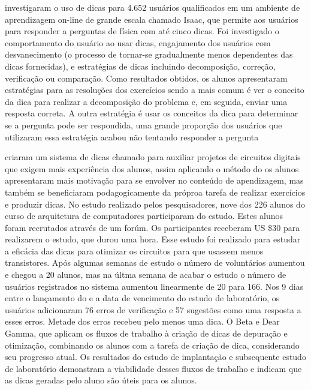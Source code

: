  investigaram  o uso de dicas para 4.652 usuários qualificados em um ambiente de aprendizagem on-line de grande escala chamado Isaac, que permite aos usuários para responder a perguntas de física com até cinco dicas. Foi investigado o comportamento do usuário ao usar dicas, engajamento dos usuários com desvanecimento (o processo de tornar-se gradualmente menos dependentes das dicas fornecidas), e estratégias de dicas incluindo decomposição, correção, verificação ou comparação. Como resultados obtidos, os alunos apresentaram estratégias para as resoluções dos exercícios sendo a mais comum é ver o conceito da dica para realizar a decomposição do problema e, em seguida, enviar uma resposta correta. A outra estratégia é usar os conceitos da dica para determinar se a pergunta pode ser respondida, uma grande proporção dos usuários que utilizaram essa estratégia acabou não tentando responder a pergunta

 criaram um sistema de dicas chamado  para auxiliar projetos de circuitos digitais que exigem mais experiência dos alunos, assim aplicando o método do  os alunos apresentaram mais motivação para se envolver no conteúdo de apendizagem, mas também se beneficiaram podagogicamente da próproa tarefa de realizar exercícios e produzir dicas. No estudo realizado pelos pesquisadores, nove dos 226 alunos do curso de arquitetura de computadores participaram do estudo. Estes alunos foram recrutados através de um forúm. Os participantes receberam US \$30 para realizarem o estudo, que durou uma hora. Esse estudo foi realizado para estudar a eficácia das dicas para otimizar os circuitos para que usassem menos transistores. Após algumas semanas de estudo o número de voluntários aumentou e chegou a 20 alunos, mas na últma semana de acabar o estudo o número de usuários registrados no sistema  aumentou linearmente de 20 para 166. Nos 9 dias entre o lançamento do  e a data de vencimento do estudo de laboratório, os usuários adicionaram 76 erros de verificação e 57 sugestões como uma resposta a esses erros. Metade dos erros recebeu pelo menos uma dica. O Beta e Dear Gamma, que aplicam os fluxos de trabalho à criação de dicas de depuração e otimização, combinando os alunos com a tarefa de criação de dica, considerando seu progresso atual. Os resultados do estudo de implantação e subsequente estudo de laboratório demonstram a viabilidade desses fluxos de trabalho e indicam que as dicas geradas pelo aluno são úteis para os alunos. 

